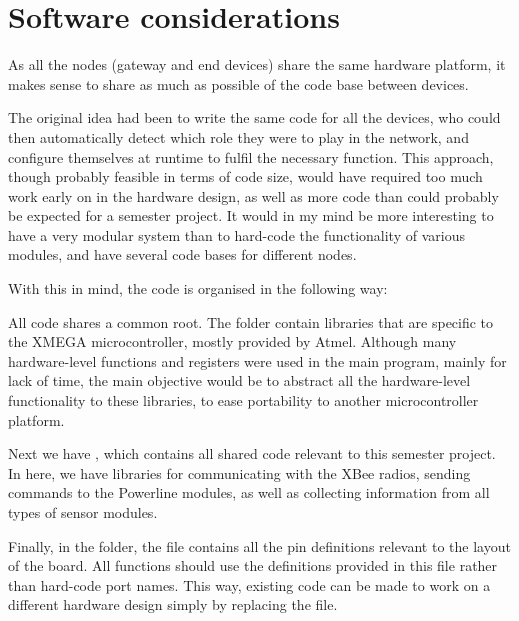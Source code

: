 



\section{Software considerations}

As all the nodes (gateway and end devices) share the same hardware platform, it
makes sense to share as much as possible of the code base between devices.

The original idea had been to write the same code for all the devices, who could
then automatically detect which role they were to play in the network, and
configure themselves at runtime to fulfil the necessary function. This approach,
though probably feasible in terms of code size, would have required too much
work early on in the hardware design, as well as more code than could probably
be expected for a semester project. It would in my mind be more interesting to
have a very modular system than to hard-code the functionality of various
modules, and have several code bases for different nodes.

With this in mind, the code is organised in the following way:


All code shares a common root. The folder  contain libraries
that are specific to the XMEGA microcontroller, mostly provided by Atmel.
Although many hardware-level functions and registers were used in the main
program, mainly for lack of time, the main objective would be to abstract all
the hardware-level functionality to these libraries, to ease portability to
another microcontroller platform.

Next we have , which contains all shared code relevant to
this semester project. In here, we have libraries for communicating with the
XBee radios, sending commands to the Powerline modules, as well as collecting
information from all types of sensor modules.

Finally, in the  folder, the  file contains
all the pin definitions relevant to the layout of the board. All functions
should use the definitions provided in this file rather than hard-code port
names. This way, existing code can be made to work on a different hardware
design simply by replacing the  file.

